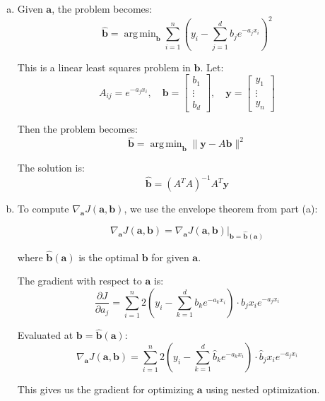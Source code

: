\documentclass[11pt]{article}
\def\argmin{\mathop{\mathrm{arg\,min}}}
\newcommand{\abf}{\mathbf{a}}
\newcommand{\bbf}{\mathbf{b}}
\newcommand{\wbf}{\mathbf{w}}
\newcommand{\wbfhat}{\widehat{\mathbf{w}}}
\newcommand{\ybf}{\mathbf{y}}
\begin{document}
\begin{enumerate}
\begin{enumerate}[(a)]
However, since $\wbfhat_2(\wbf_1)$ minimizes $J(\wbf_1, \wbf_2)$ over $\wbf_2$, we have:
$$\nabla_{\wbf_2} J(\wbf_1, \wbfhat_2(\wbf_1)) = 0$$

Therefore:
$$\nabla_{\wbf_1} J_1(\wbf_1) = \nabla_{\wbf_1} J(\wbf_1, \wbfhat_2(\wbf_1))$$

This is the \emph{envelope theorem} - the gradient of the optimal value function equals the gradient of the original function with respect to the remaining variables, evaluated at the optimal solution.

\item Given $\abf$, the problem becomes:
$$\hat{\bbf} = \argmin_{\bbf} \sum_{i=1}^n \left( y_i - \sum_{j=1}^d b_j e^{-a_jx_i} \right)^2$$

This is a linear least squares problem in $\bbf$. Let:
$$A_{ij} = e^{-a_jx_i}, \quad \bbf = \begin{bmatrix} b_1 \\ \vdots \\ b_d \end{bmatrix}, \quad \ybf = \begin{bmatrix} y_1 \\ \vdots \\ y_n \end{bmatrix}$$

Then the problem becomes:
$$\hat{\bbf} = \argmin_{\bbf} \|\ybf - A\bbf\|^2$$

The solution is:
$$\hat{\bbf} = (A^T A)^{-1} A^T \ybf$$

\item To compute $\nabla_\abf J(\abf,\bbf)$, we use the envelope theorem from part (a):

$$\nabla_\abf J(\abf,\bbf) = \left. \nabla_\abf J(\abf,\bbf) \right|_{\bbf = \hat{\bbf}(\abf)}$$

where $\hat{\bbf}(\abf)$ is the optimal $\bbf$ for given $\abf$.

The gradient with respect to $\abf$ is:
$$\frac{\partial J}{\partial a_j} = \sum_{i=1}^n 2\left( y_i - \sum_{k=1}^d b_k e^{-a_kx_i} \right) \cdot b_j x_i e^{-a_jx_i}$$

Evaluated at $\bbf = \hat{\bbf}(\abf)$:
$$\nabla_\abf J(\abf,\bbf) = \sum_{i=1}^n 2\left( y_i - \sum_{k=1}^d \hat{b}_k e^{-a_kx_i} \right) \cdot \hat{b}_j x_i e^{-a_jx_i}$$

This gives us the gradient for optimizing $\abf$ using nested optimization.
\end{enumerate}

\end{enumerate}
\end{document}
